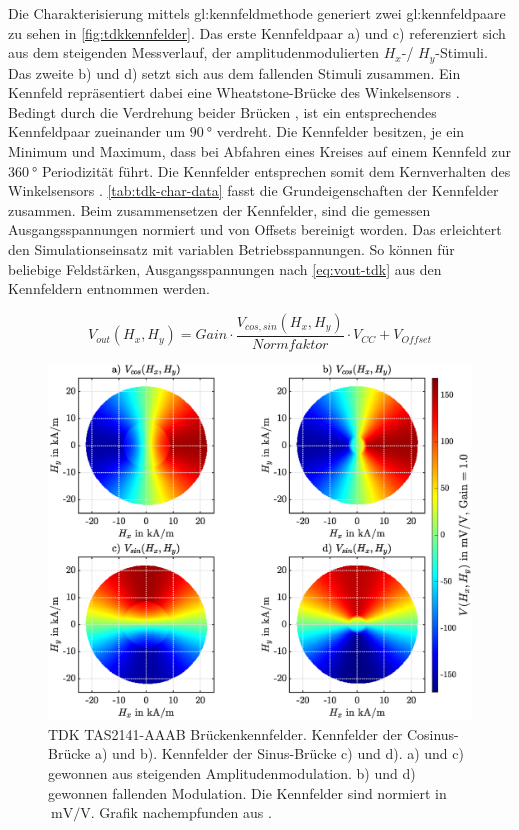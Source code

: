 Die Charakterisierung mittels \gls{gl:kennfeldmethode} generiert zwei \gls{gl:kennfeldpaar}e zu sehen in \autoref{fig:tdkkennfelder}. Das erste Kennfeldpaar a) und c) referenziert sich aus dem steigenden Messverlauf, der amplitudenmodulierten $H_x$-/ $H_y$-Stimuli. Das zweite b) und d) setzt sich aus dem fallenden Stimuli zusammen. Ein Kennfeld repräsentiert dabei eine Wheatstone-Brücke des Winkelsensors \cite{Schuethe2019}. Bedingt durch die Verdrehung beider Brücken \cite{TDK2016}, ist ein entsprechendes Kennfeldpaar zueinander um $\SI{90}{\degree}$ verdreht.
Die Kennfelder besitzen, je ein Minimum und Maximum, dass bei Abfahren eines Kreises auf einem Kennfeld zur 
$\SI{360}{\degree}$ Periodizität führt. Die Kennfelder entsprechen somit dem Kernverhalten des Winkelsensors 
\cite{TDK2016}. \autoref{tab:tdk-char-data} fasst die Grundeigenschaften der Kennfelder zusammen. Beim zusammensetzen 
der Kennfelder, sind die gemessen Ausgangsspannungen normiert und von Offsets bereinigt worden. Das erleichtert den 
Simulationseinsatz mit variablen Betriebsspannungen. So können für beliebige Feldstärken, Ausgangsspannungen nach 
\autoref{eq:vout-tdk} aus den Kennfeldern entnommen werden.


\begin{equation}\label{eq:vout-tdk}
	V_{out}(H_x,H_y) = Gain \cdot \frac{V_{cos,sin}(H_x,H_y)}{Normfaktor} \cdot V_{CC} + V_{Offset}
\end{equation}


\begin{figure}[bph]
	\centering
	\includegraphics[width=.93\linewidth]{appendix/images/3-TDK/TDK_Kennfelder}
	\caption[TDK TAS2141-AAAB Brückenkennfelder]{TDK TAS2141-AAAB Brückenkennfelder. Kennfelder der Cosinus-Brücke a) 
		und b). Kennfelder der Sinus-Brücke c) und d). a) und c) gewonnen aus steigenden Amplitudenmodulation. b) und 
		d) gewonnen fallenden Modulation. Die Kennfelder sind normiert in $\SI{}{\milli\volt\per\volt}$. Grafik 
		nachempfunden 
		aus \cite{Schuethe2019}.}
	\label{fig:tdkkennfelder}
\end{figure}



